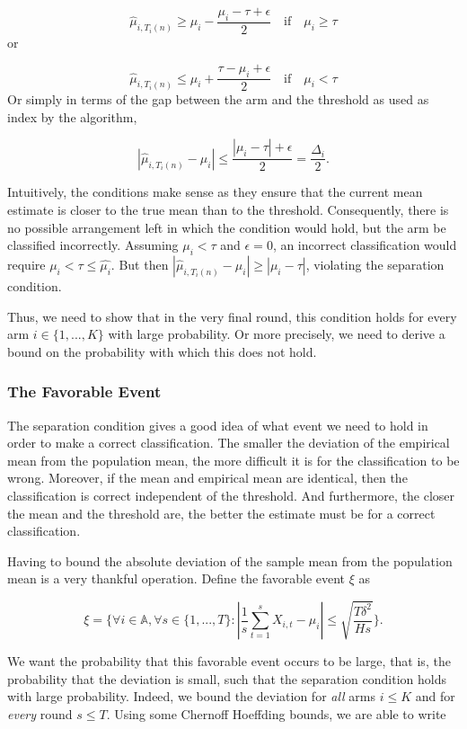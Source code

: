 \documentclass[12pt,]{article}
\begin{document}
\[
\hat{\mu}_{i,T_i(n)} \geq \mu_i - \frac{\mu_i - \tau + \epsilon}{2} \quad \text{if} \quad \mu_i \geq \tau
\] or

\[
\hat{\mu}_{i,T_i(n)} \leq \mu_i + \frac{\tau - \mu_i + \epsilon}{2} \quad \text{if} \quad \mu_i < \tau
\] Or simply in terms of the gap between the arm and the threshold as
used as index by the algorithm,

\[
| \hat{\mu}_{i, T_i(n)} - \mu_i | \leq \frac{|\mu_i - \tau| + \epsilon}{2} = \frac{\Delta_i}{2}.
\]

Intuitively, the conditions make sense as they ensure that the current
mean estimate is closer to the true mean than to the threshold.
Consequently, there is no possible arrangement left in which the
condition would hold, but the arm be classified incorrectly. Assuming
\(\mu_i < \tau\) and \(\epsilon = 0\), an incorrect classification would
require \(\mu_i < \tau \leq \hat{\mu_i}\). But then
\(| \hat{\mu}_{i, T_i(n)} - \mu_i | \geq |\mu_i - \tau|\), violating the
separation condition.

Thus, we need to show that in the very final round, this condition holds
for every arm \(i \in \{1,...,K\}\) with large probability. Or more
precisely, we need to derive a bound on the probability with which this
does not hold.

\subsubsection{The Favorable Event}\label{the-favorable-event}

The separation condition gives a good idea of what event we need to hold
in order to make a correct classification. The smaller the deviation of
the empirical mean from the population mean, the more difficult it is
for the classification to be wrong. Moreover, if the mean and empirical
mean are identical, then the classification is correct independent of
the threshold. And furthermore, the closer the mean and the threshold
are, the better the estimate must be for a correct classification.

Having to bound the absolute deviation of the sample mean from the
population mean is a very thankful operation. Define the favorable event
\(\xi\) as

\[
\xi = \Big\{\forall i \in \mathbb{A}, \forall s \in \{1,...,T\} : |\frac{1}{s} \sum_{t=1}^{s}X_{i,t} - \mu_i| \leq \sqrt{\frac{T \delta^2}{H s}} \Big\}.
\]

We want the probability that this favorable event occurs to be large,
that is, the probability that the deviation is small, such that the
separation condition holds with large probability. Indeed, we bound the
deviation for \emph{all} arms \(i \leq K\) and for \emph{every} round
\(s \leq T\). Using some Chernoff Hoeffding bounds, we are able to write
\end{document}
